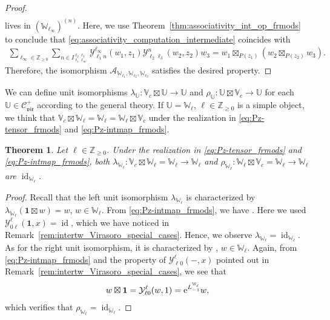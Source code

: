 \documentclass[10pt,a4paper]{amsart}
\numberwithin{equation}{section}
\newtheorem{thm}{Theorem}[section]
\newcommand{\ol}[1]{\overline{#1}}
\newcommand{\id}{\operatorname{id}}
\newcommand{\bZ}{\mathbb{Z}}
\newcommand{\cA}{\mathcal{A}}
\newcommand{\cC}{\mathcal{C}}
\newcommand{\catVir}{\cC_{\vir}}
\newcommand{\Chan}[4]{I^{#1 #2}_{#3 #4}}
\newcommand{\voavac}{\mathbf{1}}
\newcommand{\voaint}{\mathcal{Y}}
\newcommand{\vmodvec}{w}
\newcommand{\virvoa}{\mathbb{V}}
\newcommand{\virmod}{\mathbb{W}}
\newcommand{\virmodgen}{\mathbb{U}}
\newcommand{\vir}{\mathfrak{vir}}
\begin{document}
\begin{proof}
\begin{gather*}
\end{gather*}
lives in $(\virmod_{\ell_{\infty}})^{(n)}$.
Here, we use Theorem~\ref{thm:associativity_int_op_frmods} to conclude that \eqref{eq:associativity_computation_intermediate} coincides with
\begin{align*}
 \sum_{\ell_{\infty}\in\bZ_{\geq 0}}\sum_{n\in \Chan{\ell_{2}}{\ell_{3}}{\ell_{1}}{\ell_{\infty}}}\voaint_{\ell_{1} n}^{\ell_{\infty}}(\vmodvec_{1},z_{1})\voaint_{\ell_{2} \ell_{3}}^{n}(\vmodvec_{2},z_{2})\vmodvec_{3}=\vmodvec_{1}\boxtimes_{P(z_{1})}(\vmodvec_{2}\boxtimes_{P(z_{2})}\vmodvec_{3}).
\end{align*}
Therefore, the isomorphism $\cA_{\virmod_{\ell_{1}},\virmod_{\ell_{2}},\virmod_{\ell_{3}}}$ satisfies the desired property.
\end{proof}

We can define unit isomorphisms $\lambda_{\virmodgen}\colon \virvoa_{c}\boxtimes\virmodgen\to\virmodgen$ and $\rho_{\virmodgen}\colon \virmodgen\boxtimes\virvoa_{c}\to \virmodgen$ for each $\virmodgen\in\catVir^{+}$ according to the general theory.
If $\virmodgen=\virmod_{\ell}$, $\ell\in\bZ_{\geq 0}$ is a simple object, we think that $\virvoa_{c}\boxtimes\virmod_{\ell}=\virmod_{\ell}=\virmod_{\ell}\boxtimes\virvoa_{c}$ under the realization in \eqref{eq:Pz-tensor_frmods} and \eqref{eq:Pz-intmap_frmods}.
\begin{thm}
\label{thm:unit_isom_catvir}
Let $\ell\in\bZ_{\geq 0}$. Under the realization in \eqref{eq:Pz-tensor_frmods} and \eqref{eq:Pz-intmap_frmods}, both $\lambda_{\virmod_{\ell}}\colon \virvoa_{c}\boxtimes \virmod_{\ell}=\virmod_{\ell}\to\virmod_{\ell}$ and $\rho_{\virmod_{\ell}}\colon \virmod_{\ell}\boxtimes\virvoa_{c}=\virmod_{\ell}\to\virmod_{\ell}$ are $\id_{\virmod_{\ell}}$.
\end{thm}
\begin{proof}
Recall that the left unit isomorphism $\lambda_{\virmod_{\ell}}$ is characterized by $\lambda_{\virmod_{\ell}}(\voavac\boxtimes \vmodvec)=\vmodvec$, $\vmodvec\in\virmod_{\ell}$.
From \eqref{eq:Pz-intmap_frmods}, we have
\smash{$
 \voavac\boxtimes \vmodvec=\voaint_{0 \ell}^{\ell}(\voavac,1)\vmodvec=\vmodvec$}.
Here we used $\voaint_{0 \ell}^{\ell}(\voavac,x)=\id$, which we have noticed in Remark~\ref{rem:intertw_Virasoro_special_cases}.
Hence, we observe $\lambda_{\virmod_{\ell}}=\id_{\virmod_{\ell}}$.
As for the right unit isomorphism, it is characterized by \smash{$\ol{\rho_{\virmod_{\ell}}}(\vmodvec\boxtimes \voavac)={\rm e}^{L^{\virmod_{\ell}}_{-1}}\vmodvec$}, $\vmodvec\in\virmod_{\ell}$.
Again, from \eqref{eq:Pz-intmap_frmods} and the property of $\voaint_{\ell 0}^{\ell}(-,x)$ pointed out in Remark~\ref{rem:intertw_Virasoro_special_cases}, we see that
\begin{gather*}
 \vmodvec\boxtimes \voavac = \voaint_{\ell 0}^{\ell}(\vmodvec,1)={\rm e}^{L^{\virmod_{\ell}}_{-1}}\vmodvec,
\end{gather*}
which verifies that $\rho_{\virmod_{\ell}}=\id_{\virmod_{\ell}}$.
\end{proof}
\end{document}
